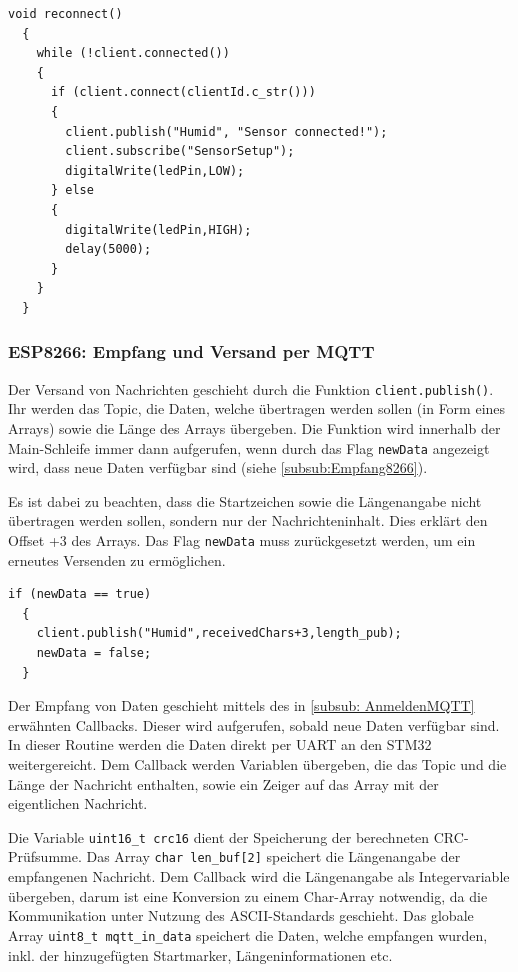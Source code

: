 \begin{lstlisting}[caption={\textit{Funktion reconnect()}}]
  void reconnect() 
  {
    while (!client.connected()) 
    {
      if (client.connect(clientId.c_str())) 
      {
        client.publish("Humid", "Sensor connected!");
        client.subscribe("SensorSetup");
        digitalWrite(ledPin,LOW);
      } else 
      {
        digitalWrite(ledPin,HIGH);
        delay(5000);
      }
    }
  }    
\end{lstlisting}

\subsubsection{ESP8266: Empfang und Versand per MQTT}

Der Versand von Nachrichten geschieht durch die Funktion \lstinline!client.publish()!. Ihr werden das Topic, die Daten, welche übertragen
werden sollen (in Form eines Arrays) sowie die Länge des Arrays übergeben. Die Funktion wird innerhalb der Main-Schleife immer dann
aufgerufen, wenn durch das Flag \lstinline!newData! angezeigt wird, dass neue Daten verfügbar sind (siehe \ref{subsub:Empfang8266}).

\smallskip

Es ist dabei zu beachten, dass die Startzeichen sowie die Längenangabe nicht übertragen werden sollen, sondern nur der Nachrichteninhalt.
Dies erklärt den Offset +3 des Arrays. Das Flag \lstinline!newData! muss zurückgesetzt werden, um ein erneutes Versenden zu ermöglichen.

\begin{lstlisting}[caption={\textit{Versand per MQTT}}]
  if (newData == true)
  {
    client.publish("Humid",receivedChars+3,length_pub);  
    newData = false;
  }
\end{lstlisting}

Der Empfang von Daten geschieht mittels des in \ref{subsub: AnmeldenMQTT} erwähnten Callbacks. Dieser wird aufgerufen, sobald neue Daten
verfügbar sind. In dieser Routine werden die Daten direkt per \ac{UART} an den STM32 weitergereicht. Dem Callback werden Variablen
übergeben, die das Topic und die Länge der Nachricht enthalten, sowie ein Zeiger auf das Array mit der eigentlichen Nachricht.

\smallskip

Die Variable \lstinline!uint16_t crc16! dient der Speicherung der berechneten CRC-Prüfsumme. Das Array \lstinline!char len_buf[2]! speichert
die Längenangabe der empfangenen Nachricht. Dem Callback wird die Längenangabe als Integervariable übergeben, darum ist eine Konversion
zu einem Char-Array notwendig, da die Kommunikation unter Nutzung des \ac{ASCII}-Standards geschieht. Das globale Array 
\lstinline!uint8_t mqtt_in_data! speichert die Daten, welche empfangen wurden, inkl. der hinzugefügten Startmarker, Längeninformationen etc.


